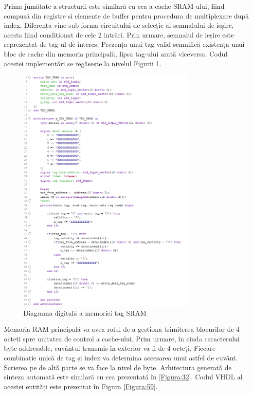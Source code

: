 \documentclass[12pt]{article}
\begin{document}
Prima jumătate a structurii este similară cu cea a cache SRAM-ului, fiind compusă din registre si elemente de buffer pentru procedura de multiplexare după index. Diferența vine sub forma circuitului de selecție al semnalului de ieșire, acesta fiind condiționat de cele 2 intrări. Prin urmare, semnalul de ieșire este reprezentat de tag-ul de interes. Prezența unui tag valid semnifică existența unui bloc de cache din memoria principală, lipsa tag-ului arată viceversa. Codul acestei implementări se regăsește la nivelul Figurii \ref{Figura:58}.

  \begin{figure}[h!]
 \includegraphics[width=0.8\textwidth]{tagsramvhdl.png}
 \centering
 \caption{Diagrama digitală a memoriei tag SRAM}
 \label{Figura:58}
 \end{figure}
  
\newpage
Memoria RAM principală va avea rolul de a gestiona trimiterea blocurilor de 4 octeți spre unitatea de control a cache-ului. Prim urmare, în ciuda caracterului byte-addresable, cuvântul transmis în exterior va fi de 4 octeți. Fiecare combinație unică de tag și index va determina accesarea unui astfel de cuvânt. Scrierea pe de altă parte se va face la nivel de byte. Arhitectura generată de sinteza automată este similară cu cea prezentată în \ref{Figura:32}. Codul VHDL al acestei entități este prezentat în Figura \ref{Figura:59}.
\end{document}
